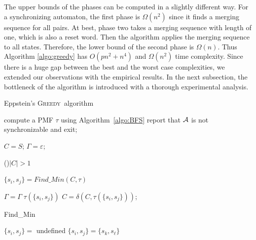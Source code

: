 \documentclass[12pt]{article}
\newcommand{\greedyAlgo}{\textsc{Greedy}}
\begin{document}
The upper bounds of the phases can be computed in a slightly different way. For a synchronizing automaton, the first phase is $\Omega(n^2)$ since it finds a merging sequence for all pairs. At best, phase two takes a merging sequence with length of one, which is also a reset word. Then the algorithm applies the merging sequence to all states. Therefore, the lower bound of the second phase is $\Omega(n)$. Thus Algorithm \ref{algo:greedy} has $O(pn^2 + n^4)$ and $\Omega(n^2)$ time complexity. Since there is a huge gap between the best  and the worst case complexities, we extended our observations with the empirical results. In the next subsection, the bottleneck of the algorithm is introduced with a thorough experimental analysis.

\begin{algorithm}[ht]
	\caption{Eppstein's \greedyAlgo\ algorithm}
	\label{algo:greedy}
	
	
	compute a PMF $\tau$ using Algorithm~\ref{algo:BFS}\;
	{
		report that ${\cal A}$ is not synchronizable and exit;	
	}

	
	$C = S$; 
	$\Gamma = \varepsilon$; 
	
	\While(){$|C| > 1$}
	{
		$\{ s_i,s_j \} = Find\_Min(C, \tau)$\;
		
		
		$\Gamma = \Gamma \; \tau(\{ s_i,s_j \})$\;
		$C = \delta(C,\tau(\{ s_i,s_j \}))$;
	}
\end{algorithm}


\begin{algorithm}[ht]
	\caption{Find\_Min}
	\label{algo:find-min}
	
	
	$\{ s_i,s_j \} =$ undefined\;
	{
		{
			$\{ s_i,s_j \} = \{ s_k, s_\ell \}$
		}
	}
\end{algorithm}
\end{document}
